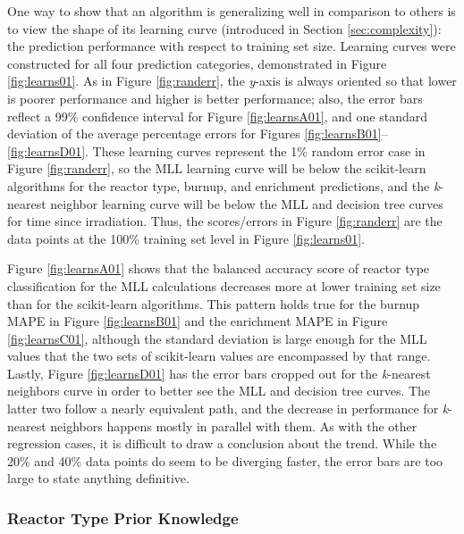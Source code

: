 One way to show that an algorithm is generalizing well in comparison to others
is to view the shape of its learning curve (introduced in Section
\ref{sec:complexity}): the prediction performance with respect to training set
size.  Learning curves were constructed for all four prediction categories,
demonstrated in Figure \ref{fig:learns01}. As in Figure \ref{fig:randerr}, the
\textit{y}-axis is always oriented so that lower is poorer performance and
higher is better performance; also, the error bars reflect a 99\% confidence
interval for Figure \ref{fig:learnsA01}, and one standard deviation of the
average percentage errors for Figures \ref{fig:learnsB01}--\ref{fig:learnsD01}.
These learning curves represent the 1\% random error case in Figure
\ref{fig:randerr}, so the \gls{MLL} learning curve will be below the
scikit-learn algorithms for the reactor type, burnup, and enrichment
predictions, and the \textit{k}-nearest neighbor learning curve will be below
the \gls{MLL} and decision tree curves for time since irradiation.  Thus, the
scores/errors in Figure \ref{fig:randerr} are the data points at the 100\%
training set level in Figure \ref{fig:learns01}.  

Figure \ref{fig:learnsA01} shows that the balanced accuracy score of reactor type
classification for the \gls{MLL} calculations decreases more at lower training
set size than for the scikit-learn algorithms.  This pattern holds true for the
burnup \gls{MAPE} in Figure \ref{fig:learnsB01} and the enrichment \gls{MAPE} in
Figure \ref{fig:learnsC01}, although the standard deviation is large enough for
the \gls{MLL} values that the two sets of scikit-learn values are encompassed
by that range. Lastly, Figure \ref{fig:learnsD01} has the error bars cropped out
for the \textit{k}-nearest neighbors curve in order to better see the \gls{MLL}
and decision tree curves. The latter two follow a nearly equivalent path, and
the decrease in performance for \textit{k}-nearest neighbors happens mostly in
parallel with them. As with the other regression cases, it is difficult to draw
a conclusion about the trend. While the 20\% and 40\% data points do seem to be
diverging faster, the error bars are too large to state anything definitive.

\subsubsection{Reactor Type Prior Knowledge}

